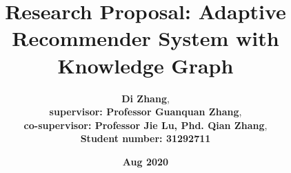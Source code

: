 \documentclass[12pt,a4 paper,title page]{article}
\title{Research Proposal: Adaptive Recommender System with Knowledge Graph}
\author{\large\textbf{Di Zhang}, \\
\textbf{supervisor: Professor Guanquan Zhang}, \\
\textbf{co-supervisor: Professor Jie Lu, Phd. Qian Zhang}, \\
\textbf{Student number: 31292711}}
\date{\Large{\textbf{Aug 2020}}}
\theoremstyle{definition}
\begin{document}
\sloppy
\maketitle

\tableofcontents
\newpage















\clearpage
\end{document}
